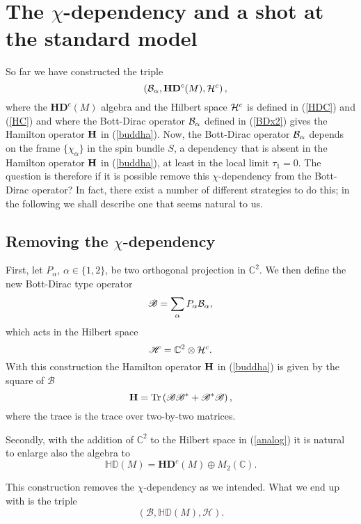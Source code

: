 \documentclass[12pt]{article}
\def\a{\alpha}
\def\cb{{\cal B}}
\def\ch{{\cal H}}
\newcommand{\Tr}{\operatorname{Tr}}
\begin{document}
\section{The $\chi$-dependency and a shot at the standard model}

So far we have constructed the triple
$$
 \quad \left( \cb_\a , \mathbf{HD}^c(M), \ch^c \right),
$$
where the $\mathbf{HD}^c(M)$ algebra and the Hilbert space $\ch^c$ is defined in (\ref{HDC}) and (\ref{HC}) and where the Bott-Dirac operator $\cb_\a$ defined in (\ref{BDx2}) gives the Hamilton operator ${\bf H}$ in (\ref{buddha}). 
Now, the Bott-Dirac operator $\cb_\a$ depends on the frame $\{\chi_\a\}$ in the spin bundle $S$, a dependency that is absent in the Hamilton operator ${\bf H}$ in (\ref{buddha}), at least in the local limit $\tau_1=0$. The question is therefore if it is possible remove this $\chi$-dependency from the Bott-Dirac operator? 
In fact, there exist a number of different strategies to do this; in the following we shall describe one that seems natural to us. 



\subsection{Removing the $\chi$-dependency}



First, let $P_\a$, $\a\in\{1,2\}$, be two orthogonal projection in $\mathbb{C}^2$. We then define the new Bott-Dirac type operator
\begin{equation}
    \mathscr{B} = \sum_\a P_\a \cb_\a,
    \label{hedebolge}
\end{equation}
which acts in the Hilbert space 
\begin{equation}
\mathscr{H} = \mathbb{C}^2  \otimes  \ch^c  .
\label{analog}
\end{equation}
With this construction the Hamilton operator ${\bf H}$ in (\ref{buddha}) is given by the square of $\mathscr{B} $ 
$$
{\bf H} =\Tr \left( \mathscr{B} \mathscr{B}^* + \mathscr{B}^* \mathscr{B} \right),
$$
where the trace is the trace over two-by-two matrices.

Secondly, with the addition of $\mathbb{C}^2$ to the Hilbert space in (\ref{analog}) it is natural to enlarge also the algebra to
$$
 \mathds{HD}(M)= \mathbf{HD}^c(M) \oplus  M_2(\mathbb{C}).
$$

This construction removes the $\chi$-dependency as we intended. What we end up with is the triple
$$
(\mathscr{B} , \mathds{HD}(M),  \mathscr{H}   ).
$$
\end{document}

